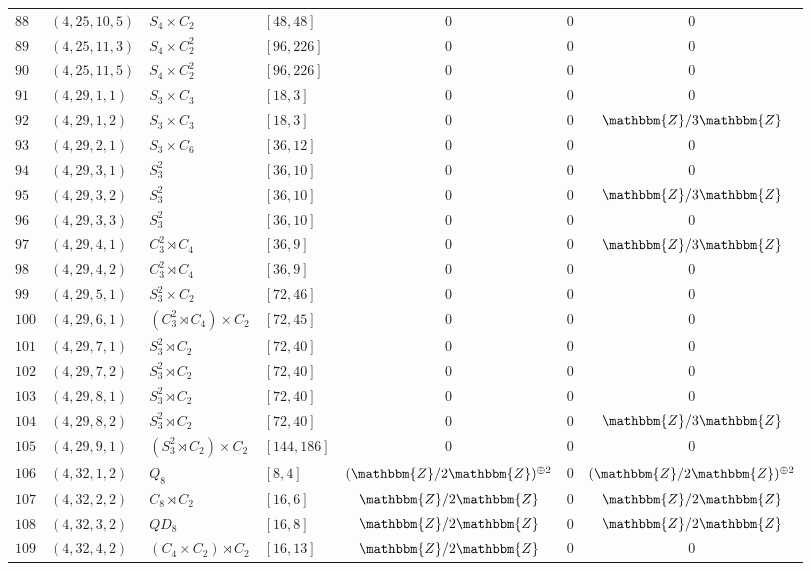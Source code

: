 \documentclass{amsart}
\theoremstyle{plain}
\theoremstyle{definition}
\theoremstyle{remark}
\newcommand{\bZ}{\mathbbm{Z}}\newcommand{\bQ}{\mathbbm{Q}}
\begin{document}
{\begin{longtable}{llll|ccc}
$88$ & $( 4, 25, 10, 5 )$ & $S_4\times C_2$ & $[ 48, 48 ]$& $0$ & $0$ & $0$\\
$89$ & $( 4, 25, 11, 3 )$ & $S_4 \times C_2^2$ & $[ 96, 226 ]$& $0$ & $0$ & $0$\\
$90$ & $( 4, 25, 11, 5 )$ & $S_4 \times C_2^2$ & $[ 96, 226 ]$& $0$ & $0$ & $0$\\
$91$ & $( 4, 29, 1, 1 )$ & $S_3 \times C_3$ & $[ 18, 3 ]$& $0$ & $0$ & $0$\\
$92$ & $( 4, 29, 1, 2 )$ & $S_3 \times C_3$ & $[ 18, 3 ]$& $0$ & $0$ & $\bZ/3\bZ$\\
$93$ & $( 4, 29, 2, 1 )$ & $S_3 \times C_6$ & $[ 36, 12 ]$& $0$ & $0$ & $0$\\
$94$ & $( 4, 29, 3, 1 )$ & $S_3^2$ & $[ 36, 10 ]$& $0$ & $0$ & $0$\\
$95$ & $( 4, 29, 3, 2 )$ & $S_3^2$ & $[ 36, 10 ]$& $0$ & $0$ & $\bZ/3\bZ$\\
$96$ & $( 4, 29, 3, 3 )$ & $S_3^2$ & $[ 36, 10 ]$& $0$ & $0$ & $0$\\
$97$ & $( 4, 29, 4, 1 )$ & $C_3^2 \rtimes C_4$ & $[ 36, 9 ]$& $0$ & $0$ & $\bZ/3\bZ$\\
$98$ & $( 4, 29, 4, 2 )$ & $C_3^2 \rtimes C_4$ & $[ 36, 9 ]$& $0$ & $0$ & $0$\\
$99$ & $( 4, 29, 5, 1 )$ & $S_3^2 \times C_2$ & $[ 72, 46 ]$& $0$ & $0$ & $0$\\
$100$ & $( 4, 29, 6, 1 )$ & $(C_3^2 \rtimes C_4) \times C_2$ & $[72, 45 ]$& $0$ & $0$ & $0$\\
$101$ & $( 4, 29, 7, 1 )$ & $S_3^2 \rtimes C_2$ & $[ 72, 40 ]$& $0$ & $0$ & $0$\\
$102$ & $( 4, 29, 7, 2 )$ & $S_3^2 \rtimes C_2$ & $[ 72, 40 ]$& $0$ & $0$ & $0$\\
$103$ & $( 4, 29, 8, 1 )$ & $S_3^2 \rtimes C_2$ & $[ 72, 40 ]$& $0$ & $0$ & $0$\\
$104$ & $( 4, 29, 8, 2 )$ & $S_3^2 \rtimes C_2$ & $[ 72, 40 ]$& $0$ & $0$ & $\bZ/3\bZ$\\
$105$ & $( 4, 29, 9, 1 )$ & $(S_3^2 \rtimes C_2) \times C_2$ & $[ 144, 186 ]$& $0$ & $0$ & $0$\\
$106$ & $( 4, 32, 1, 2 )$ & $Q_8$ & $[ 8, 4 ]$& $(\bZ/2\bZ)^{\oplus 2}$ & $0$ & $(\bZ/2\bZ)^{\oplus 2}$\\
$107$ & $( 4, 32, 2, 2 )$ & $C_8 \rtimes C_2$ & $[ 16, 6 ]$& $\bZ/2\bZ$ & $0$ & $\bZ/2\bZ$\\
$108$ & $( 4, 32, 3, 2 )$ & $QD_8$ & $[ 16, 8 ]$& $\bZ/2\bZ$ & $0$ & $\bZ/2\bZ$\\
$109$ & $( 4, 32, 4, 2 )$ & $(C_4 \times C_2) \rtimes C_2$ & $[ 16, 13 ]$& $\bZ/2\bZ$ & $0$ & $0$\\

\end{longtable}}
\end{document}
